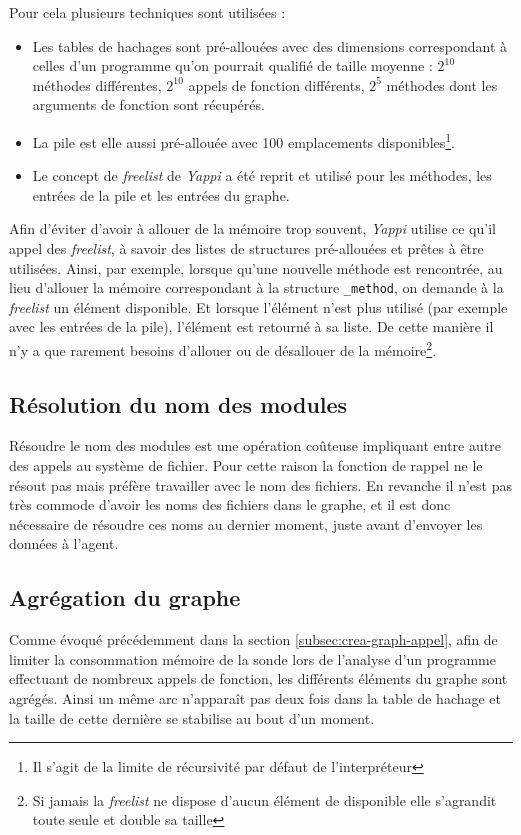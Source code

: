 Pour cela plusieurs techniques sont utilisées : 
\begin{itemize}
\item Les tables de hachages sont pré-allouées avec des dimensions correspondant à celles d'un programme qu'on pourrait qualifié de taille moyenne : $2^{10}$ méthodes différentes, $2^{10}$ appels de fonction différents, $2^5$ méthodes dont les arguments de fonction sont récupérés.
\item La pile est elle aussi pré-allouée avec 100 emplacements disponibles\footnote{Il s'agit de la limite de récursivité par défaut de l'interpréteur \Python}.
\item Le concept de \emph{freelist} de \emph{Yappi} a été reprit et utilisé pour les méthodes, les entrées de la pile et les entrées du graphe.
\end{itemize}

\begin{note}[freelist]
Afin d'éviter d'avoir à allouer de la mémoire trop souvent, \emph{Yappi} utilise ce qu'il appel des \emph{freelist}, à savoir des listes de structures pré-allouées et prêtes à être utilisées. Ainsi, par exemple, lorsque qu'une nouvelle méthode est rencontrée, au lieu d'allouer la mémoire correspondant à la structure \verb|_method|, on demande à la \emph{freelist} un élément disponible. Et lorsque l'élément n'est plus utilisé (par exemple avec les entrées de la pile), l'élément est retourné à sa liste. De cette manière il n'y a que rarement besoins d'allouer ou de désallouer de la mémoire\footnote{Si jamais la \emph{freelist} ne dispose d'aucun élément de disponible elle s'agrandit toute seule et double sa taille}.
\end{note}

\subsection{Résolution du nom des modules}
Résoudre le nom des modules est une opération coûteuse impliquant entre autre des appels au système de fichier. Pour cette raison la fonction de rappel ne le résout pas mais préfère travailler avec le nom des fichiers. En revanche il n'est pas très commode d'avoir les noms des fichiers dans le graphe, et il est donc nécessaire de résoudre ces noms au dernier moment, juste avant d'envoyer les données à l'agent.

\subsection{Agrégation du graphe}
Comme évoqué précédemment dans la section \vref{subsec:crea-graph-appel}, afin de limiter la consommation mémoire de la sonde lors de l'analyse d'un programme effectuant de nombreux appels de fonction, les différents éléments du graphe sont agrégés. Ainsi un même arc n’apparaît pas deux fois dans la table de hachage et la taille de cette dernière se stabilise au bout d'un moment.

